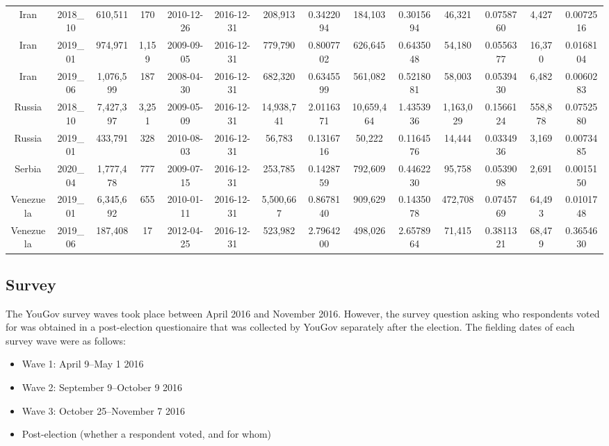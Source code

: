 \documentclass[
  12pt,
]{article}
\providecommand{\tightlist}{%
  \setlength{\itemsep}{0pt}\setlength{\parskip}{0pt}}
\begin{document}
\begin{landscape}
\begin{table}[!h]
{\begin{tabular}[t]{cccccccccccccc}
Iran & 2018\_10 & 610,511 & 170 & 2010-12-26 & 2016-12-31 & 208,913 & 0.3422094 & 184,103 & 0.3015694 & 46,321 & 0.0758760 & 4,427 & 0.0072516\\
\addlinespace
Iran & 2019\_01 & 974,971 & 1,159 & 2009-09-05 & 2016-12-31 & 779,790 & 0.8007702 & 626,645 & 0.6435048 & 54,180 & 0.0556377 & 16,370 & 0.0168104\\
Iran & 2019\_06 & 1,076,599 & 187 & 2008-04-30 & 2016-12-31 & 682,320 & 0.6345599 & 561,082 & 0.5218081 & 58,003 & 0.0539430 & 6,482 & 0.0060283\\
Russia & 2018\_10 & 7,427,397 & 3,251 & 2009-05-09 & 2016-12-31 & 14,938,741 & 2.0116371 & 10,659,464 & 1.4353936 & 1,163,029 & 0.1566124 & 558,878 & 0.0752580\\
Russia & 2019\_01 & 433,791 & 328 & 2010-08-03 & 2016-12-31 & 56,783 & 0.1316716 & 50,222 & 0.1164576 & 14,444 & 0.0334936 & 3,169 & 0.0073485\\
Serbia & 2020\_04 & 1,777,478 & 777 & 2009-07-15 & 2016-12-31 & 253,785 & 0.1428759 & 792,609 & 0.4462230 & 95,758 & 0.0539098 & 2,691 & 0.0015150\\
\addlinespace
Venezuela & 2019\_01 & 6,345,692 & 655 & 2010-01-11 & 2016-12-31 & 5,500,667 & 0.8678140 & 909,629 & 0.1435078 & 472,708 & 0.0745769 & 64,493 & 0.0101748\\
Venezuela & 2019\_06 & 187,408 & 17 & 2012-04-25 & 2016-12-31 & 523,982 & 2.7964200 & 498,026 & 2.6578964 & 71,415 & 0.3811321 & 68,479 & 0.3654630\\
\bottomrule
\end{tabular}}
\end{table}
\vfill
\end{landscape}

\clearpage

\hypertarget{survey}{%
\subsection{Survey}\label{survey}}

The YouGov survey waves took place between April 2016 and November 2016. However, the survey question asking who respondents voted for was obtained in a post-election questionaire that was collected by YouGov separately after the election. The fielding dates of each survey wave were as follows:

\begin{itemize}
\tightlist
\item
  Wave 1: April 9--May 1 2016
\item
  Wave 2: September 9--October 9 2016
\item
  Wave 3: October 25--November 7 2016
\item
  Post-election (whether a respondent voted, and for whom)
\end{itemize}
\end{document}
